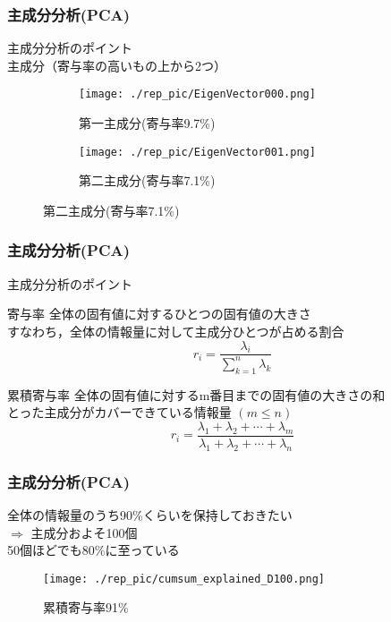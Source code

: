 \documentclass[dvipdfmx]{beamer}
\begin{document}
\begin{frame}
  \frametitle{主成分分析(PCA)}
   主成分分析のポイント \\
   主成分（寄与率の高いもの上から2つ）
   \begin{figure}
     \centering
     \begin{subfigure}{0.4\paperwidth}
       \centering
       \texttt{[image: ./rep\_pic/EigenVector000.png]}
       \caption{第一主成分(寄与率9.7\%)}
     \end{subfigure}
     \begin{subfigure}{0.4\paperwidth}
       \centering
       \texttt{[image: ./rep\_pic/EigenVector001.png]}
       \caption{第二主成分(寄与率7.1\%)}
     \end{subfigure}
   \end{figure}


\end{frame}

\begin{frame}
  \frametitle{主成分分析(PCA)}
   主成分分析のポイント
   \begin{block}{寄与率}
     全体の固有値に対するひとつの固有値の大きさ \\
     すなわち，全体の情報量に対して主成分ひとつが占める割合
     \begin{equation}
       r_{i} = \frac{\lambda_{i}}{ \textstyle\sum_{k=1}^{n}\lambda_{k}}
     \end{equation}
   \end{block}
   \begin{block}{累積寄与率}
     全体の固有値に対するm番目までの固有値の大きさの和 \\
     とった主成分がカバーできている情報量 $\left(m \le n\right)$
     \begin{equation}
       r_{i} = \frac{\lambda_{1}+\lambda_{2}+\cdots+\lambda_{m}}{ \lambda_{1}+\lambda_{2}+\cdots+\lambda_{n}}
     \end{equation}
   \end{block}
\end{frame}

\begin{frame}
  \frametitle{主成分分析(PCA)}
  全体の情報量のうち90\%くらいを保持しておきたい \\
  $ \Rightarrow $ 主成分およそ100個 \\
  50個ほどでも80\%に至っている
  \begin{figure}
    \centering
       \texttt{[image: ./rep\_pic/cumsum\_explained\_D100.png]}
       \caption{累積寄与率91\%}
  \end{figure}

\end{frame}
\end{document}
